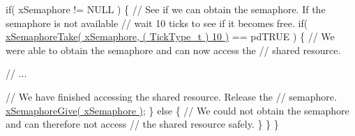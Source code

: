 \begin{DoxyPre}   if( xSemaphore != NULL )
   \{
       // See if we can obtain the semaphore.  If the semaphore is not available
       // wait 10 ticks to see if it becomes free.
       if( \hyperlink{semphr_8h_af116e436d2a5ae5bd72dbade2b5ea930}{xSemaphoreTake( xSemaphore, ( TickType\_t ) 10 )} == pdTRUE )
       \{
           // We were able to obtain the semaphore and can now access the
           // shared resource.\end{DoxyPre}



\begin{DoxyPre}           // ...\end{DoxyPre}



\begin{DoxyPre}           // We have finished accessing the shared resource.  Release the
           // semaphore.
           \hyperlink{semphr_8h_aae55761cabfa9bf85c8f4430f78c0953}{xSemaphoreGive( xSemaphore )};
       \}
       else
       \{
           // We could not obtain the semaphore and can therefore not access
           // the shared resource safely.
       \}
   \}
\}
\end{DoxyPre}
 